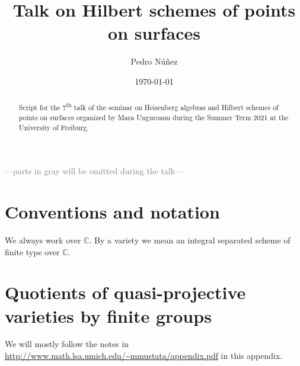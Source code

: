 \documentclass[12pt,a4paper]{amsart}
\title[Talk on Hilbert schemes of points on surfaces]{Talk on Hilbert schemes of points on surfaces}
\author[Pedro N\'{u}\~{n}ez]{Pedro N\'{u}\~{n}ez}
\date{\today}
\theoremstyle{plain}
\theoremstyle{definition}
\theoremstyle{remark}
\begin{document}
\maketitle

\begin{abstract}
  Script for the 7\textsuperscript{th} talk of the seminar on Heisenberg algebras and Hilbert schemes of points on surfaces organized by Mara Ungureanu during the Summer Term 2021 at the University of Freiburg.
\end{abstract}

\tableofcontents

\begin{center}
  \textcolor{gray}{---parts in gray will be omitted during the talk---}
\end{center}

\setcounter{section}{-1}

\section{Conventions and notation}

We always work over $\mathbb{C}$.
By a variety we mean an integral separated scheme of finite type over $\mathbb{C}$.

\appendix

\section{Quotients of quasi-projective varieties by finite groups}

We will mostly follow the notes in \url{http://www.math.lsa.umich.edu/~mmustata/appendix.pdf} in this appendix.
\end{document}
